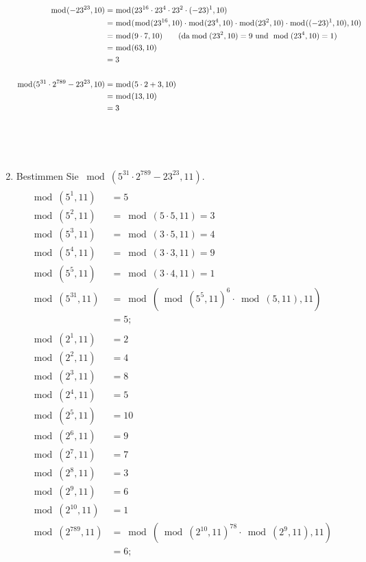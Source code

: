 \begin{enumerate}[label=(\alph*)]
\begin{align*}
			\bmod(-23^{23},10) &= \bmod(23^{16}\cdot23^{4}\cdot23^{2}\cdot(-23)^1,10) 
			\\&= \bmod(\bmod(23^{16},10)\cdot\bmod(23^{4},10)\cdot\bmod(23^{2},10)\cdot\bmod((-23)^1,10),10)
			\\&= \bmod(9\cdot 7, 10) \textrm{\qquad (da} \bmod(23^2,10)=9 \textrm{ und }\bmod(23^4,10)=1)
			\\&= \bmod(63,10) 
			\\&= 3 \\\\
			\bmod(5^{31} \cdot 2^{789}-23^{23}, 10) &= \bmod(5 \cdot 2 + 3,10)	
			\\&= \bmod(13,10) 
			\\&= 3
		\end{align*}
\\
\\
\\
		\item  Bestimmen Sie $ \bmod(5^{31} \cdot 2^{789}-23^{23}, 11) $. \
		\begin{align*}
			\\ \bmod(5^{1},11) &= 5
			\\ \bmod(5^{2},11) &= \bmod(5 \cdot 5, 11) = 3
			\\ \bmod(5^{3},11) &= \bmod(3 \cdot 5, 11) = 4
			\\ \bmod(5^{4},11) &= \bmod(3 \cdot 3, 11) = 9
			\\ \bmod(5^{5},11) &= \bmod(3 \cdot 4, 11) = 1
			\\ \bmod(5^{31},11) &= \bmod(\bmod(5^5,11)^6 \cdot \bmod(5,11), 11)  \\
			&=5;
			 \\\\
			\bmod(2^1,11) &= 2 \\
			\bmod(2^2,11) &= 4 \\
			\bmod(2^3,11) &= 8 \\
			\bmod(2^4,11) &= 5 \\
			\bmod(2^5,11) &= 10 \\
			\bmod(2^6,11) &= 9 \\
			\bmod(2^7,11) &= 7 \\
			\bmod(2^8,11) &= 3 \\
			\bmod(2^9,11) &= 6 \\
			\bmod(2^{10},11) &= 1 \\
			\bmod(2^{789},11) &= \bmod(\bmod(2^{10},11)^{78} \cdot \bmod(2^9,11),11) \\
			&= 6;\\

\end{align*}
\end{enumerate}
